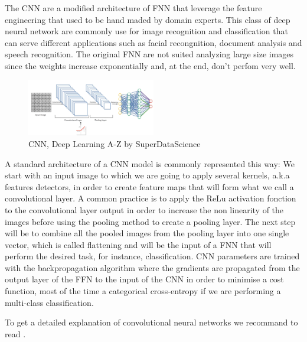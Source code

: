 \documentclass[letter]{article}\usepackage[]{graphicx}\usepackage[]{color}
\begin{document}
The CNN are a modified architecture of FNN that leverage the feature engineering that used to be hand maded by domain experts. This class of deep neural network are commonly use for image recognition and classification that can serve different applications such as facial recongnition, document analysis and speech recognition. The original FNN are not suited analyzing large size images since the weights increase exponentially and, at the end, don't perfom very well.\\
\begin{figure}
  \begin{center}
    \includegraphics[width=0.5\textwidth]{figure/CNN_process.png}
  \end{center}
  \caption{CNN, Deep Learning A-Z by SuperDataScience}
\end{figure}
A standard architecture of a CNN model is commonly represented this way: We start with an input image to which we are going to apply several kernels, a.k.a features detectors, in order to create feature maps that will form what we call a convolutional layer. A common practice is to apply the ReLu activation fonction to the convolutional layer output in order to increase the non linearity of the images before using the pooling method to create a pooling layer. The next step will be to combine all the pooled images from the pooling layer into one single vector, which is called flattening and will be the input of a FNN that will perform the desired task, for instance, classification. CNN parameters are trained with the backpropagation algorithm where the gradients are propagated from the output layer of the FFN to the input of the CNN in order to minimise a cost function, most of the time a categorical cross-entropy if we are performing a multi-class classification. 


To get a detailed explanation of convolutional neural networks we recommand to read \cite[Chapter 9]{Goodfellow-et-al-2016}.\\
\end{document}
